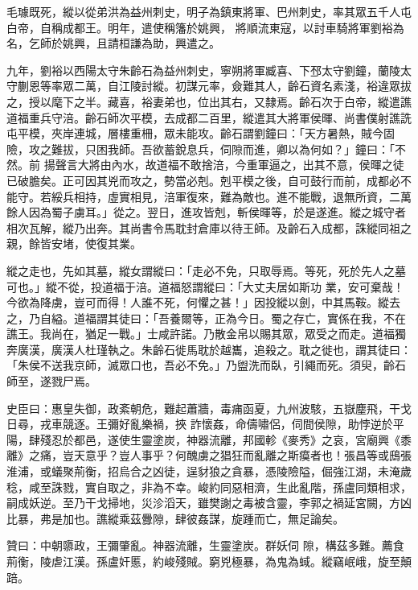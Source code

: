 \begin{pinyinscope}
 毛璩既死，縱以從弟洪為益州刺史，明子為鎮東將軍、巴州刺史，率其眾五千人屯白帝，自稱成都王。明年，遣使稱籓於姚興，
 將順流東寇，以討車騎將軍劉裕為名，乞師於姚興，且請桓謙為助，興遣之。



 九年，劉裕以西陽太守朱齡石為益州刺史，寧朔將軍臧喜、下邳太守劉鐘，蘭陵太守蒯恩等率眾二萬，自江陵討縱。初謀元率，僉難其人，齡石資名素淺，裕違眾拔之，授以麾下之半。藏喜，裕妻弟也，位出其右，又隸焉。齡石次于白帝，縱遣譙道福重兵守涪。齡石師次平模，去成都二百里，縱遣其大將軍侯暉、尚書僕射譙詵屯平模，夾岸連城，層樓重柵，眾未能攻。齡石謂劉鐘曰：「天方暑熱，賊今固險，攻之難拔，只困我師。吾欲蓄銳息兵，伺隙而進，卿以為何如？」鐘曰：「不然。前
 揚聲言大將由內水，故道福不敢捨涪，今重軍逼之，出其不意，侯暉之徒已破膽矣。正可因其兇而攻之，勢當必剋。剋平模之後，自可鼓行而前，成都必不能守。若綏兵相持，虛實相見，涪軍復來，難為敵也。進不能戰，退無所資，二萬餘人因為蜀子虜耳。」從之。翌日，進攻皆剋，斬侯暉等，於是遂進。縱之城守者相次瓦解，縱乃出奔。其尚書令馬耽封倉庫以待王師。及齡石入成都，誅縱同祖之親，餘皆安堵，使復其業。



 縱之走也，先如其墓，縱女謂縱曰：「走必不免，只取辱焉。等死，死於先人之墓可也。」縱不從，投道福于涪。道福怒謂縱曰：「大丈夫居如斯功
 業，安可棄哉！今欲為降虜，豈可而得！人誰不死，何懼之甚！」因投縱以劍，中其馬鞍。縱去之，乃自縊。道福謂其徒曰：「吾養爾等，正為今日。蜀之存亡，實係在我，不在譙王。我尚在，猶足一戰。」士咸許諾。乃散金帛以賜其眾，眾受之而走。道福獨奔廣漢，廣漢人杜瑾執之。朱齡石徙馬耽於越巂，追殺之。耽之徙也，謂其徒曰：「朱侯不送我京師，滅眾口也，吾必不免。」乃盥洗而臥，引繩而死。須臾，齡石師至，遂戮尸焉。



 史臣曰：惠皇失御，政紊朝危，難起蕭牆，毒痡函夏，九州波駭，五嶽塵飛，干戈日尋，戎車競逐。王彌好亂樂禍，挾
 詐懷姦，命儔嘯侶，伺間侯隙，助悖逆於平陽，肆殘忍於都邑，遂使生靈塗炭，神器流離，邦國軫《麥秀》之哀，宮廟興《黍離》之痛，豈天意乎？豈人事乎？何醜虜之猖狂而亂離之斯瘼者也！張昌等或䲭張淮浦，或蟻聚荊衡，招烏合之凶徒，逞豺狼之貪暴，憑陵險隘，倔強江湖，未淹歲稔，咸至誅戮，實自取之，非為不幸。峻約同惡相濟，生此亂階，孫盧同類相求，嗣成妖逆。至乃干戈掃地，災沴滔天，雖樊謝之毒被含靈，李郭之禍延宮闕，方凶比暴，弗是加也。譙縱乘茲釁隙，肆彼姦謀，旋踵而亡，無足論矣。



 贊曰：中朝隳政，王彌肇亂。神器流離，生靈塗炭。群妖伺
 隙，構茲多難。薦食荊衡，陵虐江漢。孫盧奸慝，約峻殘賊。窮兇極暴，為鬼為蜮。縱竊岷峨，旋至顛踣。




\end{pinyinscope}
